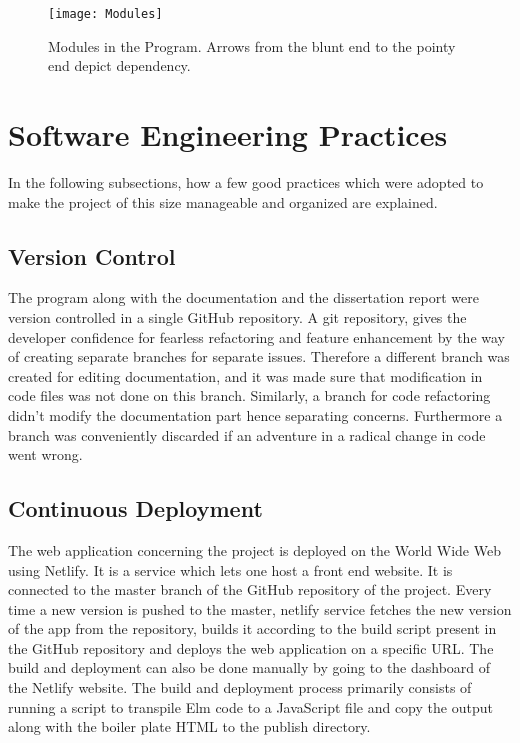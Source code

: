 \begin{figure}[h]
\centering
\texttt{[image: Modules]}
\caption{
        Modules in the Program. Arrows from the blunt end to
        the pointy end depict dependency.
        }
\end{figure}

\section{Software Engineering Practices}
In the following subsections, how a few good practices which were adopted to
make the project of this size manageable and organized are explained.

\subsection{Version Control}
The program along with the documentation and the dissertation report were
version controlled in a single GitHub repository. A git repository, gives the
developer confidence for fearless refactoring and feature enhancement by the
way of creating separate branches for separate issues. Therefore a different
branch was created for editing documentation, and it was made sure that
modification in code files was not done on this branch. Similarly, a branch for
code refactoring didn't modify the documentation part hence separating
concerns.  Furthermore a branch was conveniently discarded if an adventure in a
radical change in code went wrong.

\subsection{Continuous Deployment}
The web application concerning the project is deployed on the World Wide Web
using Netlify. It is a service which lets one host a front end website. It is
connected to the master branch of the GitHub repository of the project. Every
time a new version is pushed to the master, netlify service fetches the new
version of the app from the repository, builds it according to the build script
present in the GitHub repository and deploys the web application on a specific
URL. The build and deployment can also be done manually by going to the
dashboard of the Netlify website. The build and deployment process primarily
consists of running a script to transpile Elm code to a JavaScript file and copy
the output along with the boiler plate HTML to the publish directory.

